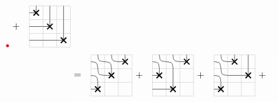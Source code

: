 \documentclass[reqno,12pt]{amsart}
\theoremstyle{definition}
\theoremstyle{remark}
\newcommand\Xmarking[2]
{\draw[very thick] (#1-0.7,#2-0.7)--(#1-0.3,#2-0.3);
\draw[very thick] (#1-0.7,#2-0.3)--(#1-0.3,#2-0.7);
\draw (#1-1,#2-0.5)--(#1-0.5,#2-0.5);
\draw (#1-0.5,#2-0.5)--(#1-0.5,#2); }
\newcommand\UP[2]{\draw (#1-0.5,#2)--(#1-0.5,#2-1);}
\newcommand\EAST[2]{\draw (#1,#2-0.5)--(#1-1,#2-0.5);}
\newcommand\Asmooth[2]
{\draw (#1,#2-0.5) .. controls (#1-0.45,#2-0.45) and (#1-0.45,#2-0.45) .. (#1-0.5,#2);
\draw (#1-1,#2-0.5) .. controls (#1-0.55,#2-0.55) and (#1-0.55,#2-0.55) .. (#1-0.5,#2-1); }
\begin{document}
\begin{align*}
\begin{tikzpicture}[scale=0.5]
                    \node[circle, fill=red, draw=red, scale=0.3] at (0.5,1.5) {};
    \end{tikzpicture}
        \begin{tikzpicture}[scale=0.5]
        \draw[white!20] (0,0) grid (1,3);
        \node[text width=0.5cm] at (0.5, 1.5) {$+$};
        \end{tikzpicture}
    \begin{tikzpicture}[scale=0.5]
        \draw[black!20] (0,0) grid (3,3);
        \Xmarking{1}{3}\Xmarking{2}{2}\Xmarking{3}{1}
        \UP{2}{3}\EAST{1}{2}\UP{3}{2}\UP{3}{3}\EAST{1}{1}\EAST{2}{1}
    \end{tikzpicture}\\
    &\begin{tikzpicture}[scale=0.5]
        \draw[white!20] (0,0) grid (1,3);
        \node[text width=0.5cm] at (0.5, 1.5) {$=$};
        \end{tikzpicture}    \begin{tikzpicture}[scale=0.5]
        \draw[black!20] (0,0) grid (3,3);
        \Xmarking{1}{1}\Xmarking{2}{2}\Xmarking{3}{3}
        \Asmooth{1}{2}\Asmooth{1}{3}\Asmooth{2}{3}
    \end{tikzpicture}
        \begin{tikzpicture}[scale=0.5]
        \draw[white!20] (0,0) grid (1,3);
        \node[text width=0.5cm] at (0.5, 1.5) {$+$};
        \end{tikzpicture}
    \begin{tikzpicture}[scale=0.5]
        \draw[black!20] (0,0) grid (3,3);
        \Xmarking{1}{2}\Xmarking{2}{1}\Xmarking{3}{3}
        \Asmooth{1}{3}\Asmooth{2}{3}
        \EAST{1}{1}\UP{2}{2}
    \end{tikzpicture}
        \begin{tikzpicture}[scale=0.5]
        \draw[white!20] (0,0) grid (1,3);
        \node[text width=0.5cm] at (0.5, 1.5) {$+$};
        \end{tikzpicture}
    \begin{tikzpicture}[scale=0.5]
        \draw[black!20] (0,0) grid (3,3);
        \Xmarking{1}{1}\Xmarking{2}{3}\Xmarking{3}{2}
        \Asmooth{1}{2}\Asmooth{1}{3}\EAST{2}{2}\UP{3}{3}
    \end{tikzpicture}
        \begin{tikzpicture}[scale=0.5]
        \draw[white!20] (0,0) grid (1,3);
        \node[text width=0.5cm] at (0.5, 1.5) {$+$};
        \end{tikzpicture}
    \begin{tikzpicture}[scale=0.5]

\end{tikzpicture}
\end{align*}
\end{document}
